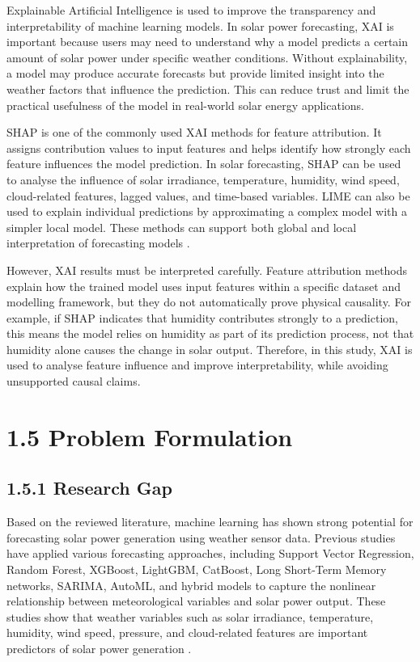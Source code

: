 Explainable Artificial Intelligence is used to improve the transparency and interpretability of machine learning models. In solar power forecasting, XAI is important because users may need to understand why a model predicts a certain amount of solar power under specific weather conditions. Without explainability, a model may produce accurate forecasts but provide limited insight into the weather factors that influence the prediction. This can reduce trust and limit the practical usefulness of the model in real-world solar energy applications.

SHAP is one of the commonly used XAI methods for feature attribution. It assigns contribution values to input features and helps identify how strongly each feature influences the model prediction. In solar forecasting, SHAP can be used to analyse the influence of solar irradiance, temperature, humidity, wind speed, cloud-related features, lagged values, and time-based variables. LIME can also be used to explain individual predictions by approximating a complex model with a simpler local model. These methods can support both global and local interpretation of forecasting models \parencite{JnanaVarshitha2025, Eren2025, TsaiLo2025, Pongphaw2025}.

However, XAI results must be interpreted carefully. Feature attribution methods explain how the trained model uses input features within a specific dataset and modelling framework, but they do not automatically prove physical causality. For example, if SHAP indicates that humidity contributes strongly to a prediction, this means the model relies on humidity as part of its prediction process, not that humidity alone causes the change in solar output. Therefore, in this study, XAI is used to analyse feature influence and improve interpretability, while avoiding unsupported causal claims.

\section{1.5 Problem Formulation}
\subsection{1.5.1 Research Gap}

Based on the reviewed literature, machine learning has shown strong potential for forecasting solar power generation using weather sensor data. Previous studies have applied various forecasting approaches, including Support Vector Regression, Random Forest, XGBoost, LightGBM, CatBoost, Long Short-Term Memory networks, SARIMA, AutoML, and hybrid models to capture the nonlinear relationship between meteorological variables and solar power output. These studies show that weather variables such as solar irradiance, temperature, humidity, wind speed, pressure, and cloud-related features are important predictors of solar power generation \parencite{JnanaVarshitha2025, Bakht2025, Eren2025, Alhassan2025}.

